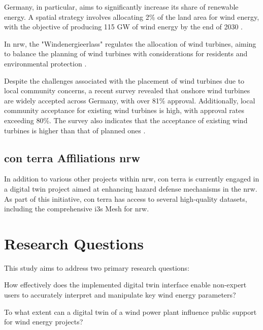 \documentclass[11pt, titlepage, a4paper]{scrartcl}
\begin{document}
\begin{linenumbers}
    Germany, in particular, aims to significantly increase its share of renewable energy. A spatial strategy involves allocating 2\% of the land area for wind energy, with the objective of producing 115 GW of wind energy by the end of 2030 \cite{WindenergieLand}.

    In \gls{nrw}, the "Windenergieerlass" \cite{nrwErlassFurPlanung} regulates the allocation of wind turbines, aiming to balance the planning of wind turbines with considerations for residents and environmental protection \cite{nrwErlassFurPlanung}.

    Despite the challenges associated with the placement of wind turbines due to local community concerns, a recent survey revealed that onshore wind turbines are widely accepted across Germany, with over 81\% approval. Additionally, local community acceptance for existing wind turbines is high, with approval rates exceeding 80\%. The survey also indicates that the acceptance of existing wind turbines is higher than that of planned ones \cite{fachagenturwindenergieanlandUmfrageZurAkzeptanz}.

    \subsection{con terra Affiliations \gls{nrw}}
    In addition to various other projects within \gls{nrw}, con terra is currently engaged in a digital twin project aimed at enhancing hazard defense mechanisms in the \gls{nrw}. As part of this initiative, con terra has access to several high-quality datasets, including the comprehensive \gls{i3s} Mesh for \gls{nrw}.


    \section{Research Questions}

    This study aims to address two primary research questions:

    \begin{questions}
        \item \label{rq:first_q} How effectively does the implemented digital twin interface enable non-expert users to accurately interpret and manipulate key wind energy parameters?
        \item \label{rq:second_q} To what extent can a digital twin of a wind power plant influence public support for wind energy projects?
    \end{questions}


\end{linenumbers}
\end{document}
